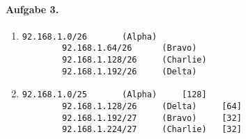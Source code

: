 \documentclass{article}
\begin{document}
\paragraph{Aufgabe 3.}

\begin{enumerate}
    \item \begin{lstlisting}[gobble=8]
        92.168.1.0/26       (Alpha)
        92.168.1.64/26      (Bravo)
        92.168.1.128/26     (Charlie)
        92.168.1.192/26     (Delta)
    \end{lstlisting}

    \item \begin{lstlisting}[gobble=8]
        92.168.1.0/25       (Alpha)     [128]
        92.168.1.128/26     (Delta)     [64]
        92.168.1.192/27     (Bravo)     [32]
        92.168.1.224/27     (Charlie)   [32]
    \end{lstlisting}
\end{enumerate}
\end{document}
